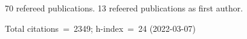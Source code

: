 70 refereed publications. 13 refeered publications as first author.

Total citations~=~2349; h-index~=~24 (2022-03-07)